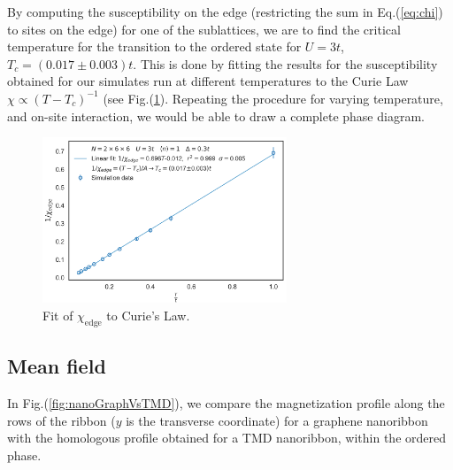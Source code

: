 By computing the susceptibility on the edge (restricting the sum in Eq.(\ref{eq:chi}) to sites on the edge) for one of the sublattices, we are to find the critical temperature for the transition to the ordered state for $U = 3 t$, $T_c = ( 0.017 \pm 0.003 ) t$.
This is done by fitting the results for the susceptibility obtained for our simulates run at different temperatures to the Curie Law $\chi \propto ( T - T_c )^{-1}$ (see Fig.(\ref{fig:chiFit}).
Repeating the procedure for varying temperature, and on-site interaction, we would be able to draw a complete phase diagram.
\begin{figure}[H]
  \centering
  \includegraphics[width=7.3cm]{images/fityang2017.png}
  \caption{Fit of $\chi_{\text{edge}}$ to Curie's Law.}
  \label{fig:chiFit}
\end{figure}

\subsection{Mean field}
\label{sec:resul}
In Fig.(\ref{fig:nanoGraphVsTMD}), we compare the magnetization profile along the rows of the ribbon ($y$ is the transverse coordinate) for a graphene nanoribbon with the homologous profile obtained for a TMD nanoribbon, within the ordered phase.

